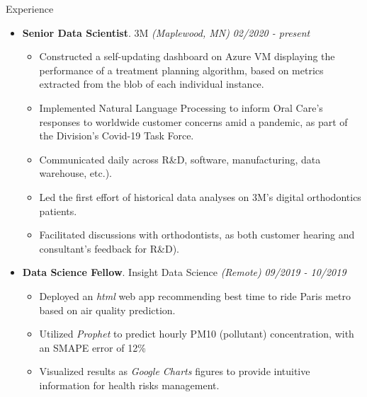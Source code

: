 \documentclass{resume} %
\begin{document}
	
	\begin{rSection}{Experience}
		
		\begin{itemize}[leftmargin=0em]
			
			\item {\bf Senior Data Scientist}{. 3M \textit{(Maplewood, MN)}} \hfill {\em 02/2020 - present}\\
			\vspace{-5mm}
			\begin{itemize}
				\setlength\itemsep{-1.75em}			
				\item Constructed a self-updating dashboard on Azure VM displaying the performance of a treatment planning algorithm, based on metrics extracted from the blob of each individual instance.\\
				\item Implemented Natural Language Processing to inform Oral Care's responses to worldwide customer concerns amid a pandemic, as part of the Division's Covid-19 Task Force.\\
				\item Communicated daily across R\&D, software, manufacturing, data warehouse, etc.).\\
				\item Led the first effort of historical data analyses on 3M's digital orthodontics patients.\\
				\item Facilitated discussions with orthodontists, as both customer hearing and consultant's feedback for R\&D).
			\end{itemize}	
		
			\item {\bf Data Science Fellow}{. Insight Data Science \textit{(Remote)}} \hfill {\em 09/2019 - 10/2019}\\
			\vspace{-5mm}
			\begin{itemize}
				\setlength\itemsep{-1.75em}
				\item Deployed an \textit{html} {web app} recommending best time to ride Paris metro based on air quality prediction.\\
				\item Utilized \textit{Prophet} to predict hourly PM10 (pollutant) concentration, with an SMAPE error of 12\% \\
				\item Visualized results as \textit{Google Charts} figures to provide intuitive information for health risks management.
			\end{itemize}	
			

\end{itemize}
\end{rSection}
\end{document}
